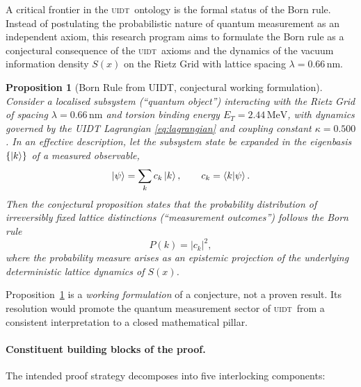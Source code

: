 \documentclass[12pt,a4paper,twoside]{article}
\theoremstyle{plain}
\newtheorem{proposition}[theorem]{Proposition}
\theoremstyle{definition}
\theoremstyle{remark}
\newcommand{\UIDT}{\textsc{uidt}}
\newcommand{\MeV}{\,\mathrm{MeV}}
\newcommand{\kappaVal}{0.500}                      %
\newcommand{\ETorsion}{2.44\MeV}                    %
\begin{document}
A critical frontier in the \UIDT\ ontology is the formal status of the Born rule.
Instead of postulating the probabilistic nature of quantum measurement as an
independent axiom, this research program aims to formulate the Born rule as a
conjectural consequence of the \UIDT\ axioms and the dynamics of the vacuum
information density $S(x)$ on the Rietz Grid with lattice spacing
$\lambda = 0.66\,\mathrm{nm}$.

\begin{proposition}[Born Rule from UIDT, conjectural working formulation]
\label{thm:born-rule-uidt}
Consider a localised subsystem (``quantum object'') interacting with the
Rietz Grid of spacing $\lambda = 0.66\,\mathrm{nm}$ and torsion binding
energy $E_T = \ETorsion$, with dynamics governed by the UIDT Lagrangian
\eqref{eq:lagrangian} and coupling constant $\kappa = \kappaVal$. In an effective
description, let the subsystem state be expanded in the eigenbasis
$\{\ket{k}\}$ of a measured observable,
\[
  \ket{\psi} = \sum_k c_k \ket{k}, \qquad c_k = \braket{k}{\psi}.
\]
Then the conjectural proposition states that the probability distribution of
irreversibly fixed lattice distinctions (``measurement outcomes'') follows
the Born rule
\[
  P(k) = |c_k|^2,
\]
where the probability measure arises as an epistemic projection of the
underlying deterministic lattice dynamics of $S(x)$.
\end{proposition}

Proposition~\ref{thm:born-rule-uidt} is a \emph{working formulation} of a
conjecture, not a proven result. Its resolution would promote the quantum
measurement sector of \UIDT\ from a consistent interpretation to a closed
mathematical pillar.

\paragraph{Constituent building blocks of the proof.}
The intended proof strategy decomposes into five interlocking components:
\end{document}
